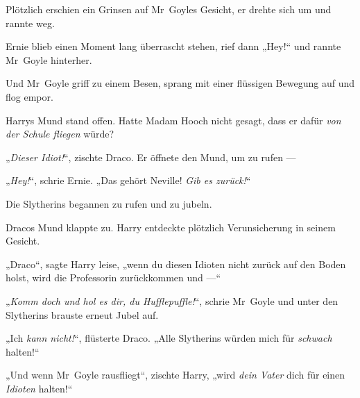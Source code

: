 Plötzlich erschien ein Grinsen auf Mr~Goyles Gesicht, er drehte sich um und rannte weg.

Ernie blieb einen Moment lang überrascht stehen, rief dann
„Hey!“ und rannte Mr~Goyle hinterher.

Und Mr~Goyle griff zu einem Besen, sprang mit einer flüssigen Bewegung auf und flog empor.

Harrys Mund stand offen. Hatte Madam Hooch nicht gesagt, dass er dafür \emph{von der Schule fliegen} würde?

„\emph{Dieser Idiot!}“, zischte Draco. Er öffnete den Mund, um zu rufen —

„\emph{Hey!}“, schrie Ernie.
„Das gehört Neville! \emph{Gib es zurück!}“

Die Slytherins begannen zu rufen und zu jubeln.

Dracos Mund klappte zu. Harry entdeckte plötzlich Verunsicherung in seinem Gesicht.

„Draco“, sagte Harry leise, „wenn du diesen Idioten nicht zurück auf den Boden holst, wird die Professorin zurückkommen und —“

„\emph{Komm doch und hol es dir, du Hufflepuffle!}“, schrie Mr~Goyle und unter den Slytherins brauste erneut Jubel auf.

„Ich \emph{kann nicht!}“, flüsterte Draco.
„Alle Slytherins würden mich für \emph{schwach} halten!“

„Und wenn Mr~Goyle rausfliegt“, zischte Harry, „wird \emph{dein Vater} dich für einen \emph{Idioten} halten!“

